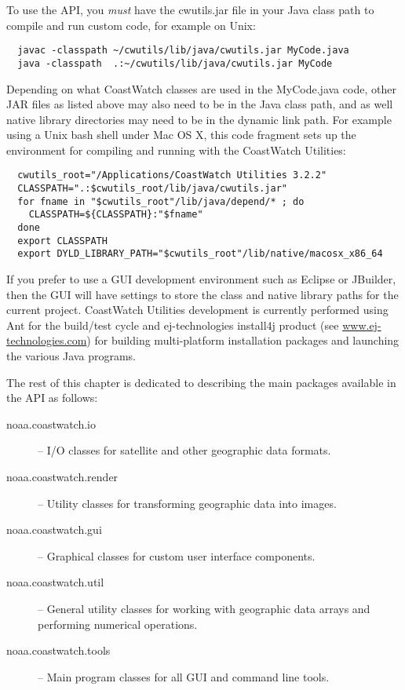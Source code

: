 To use the API, you {\em must} have the {\file cwutils.jar} file in
your Java class path to compile and run custom code, for example
on Unix:
\begin{verbatim}
  javac -classpath ~/cwutils/lib/java/cwutils.jar MyCode.java
  java -classpath  .:~/cwutils/lib/java/cwutils.jar MyCode
\end{verbatim}
Depending on what CoastWatch classes are used in the
{\file MyCode.java} code, other JAR files as listed above may also
need to be in the Java class path, and as well native library
directories may need to be in the dynamic link path.  For example
using a Unix bash shell under Mac OS X, this code fragment sets
up the environment for compiling and running with the CoastWatch
Utilities:
\begin{verbatim}
  cwutils_root="/Applications/CoastWatch Utilities 3.2.2"
  CLASSPATH=".:$cwutils_root/lib/java/cwutils.jar"
  for fname in "$cwutils_root"/lib/java/depend/* ; do
    CLASSPATH=${CLASSPATH}:"$fname"
  done
  export CLASSPATH
  export DYLD_LIBRARY_PATH="$cwutils_root"/lib/native/macosx_x86_64
\end{verbatim}
If you prefer to use a GUI development environment such as
Eclipse or JBuilder, then the GUI will have settings to store the
class and native library paths for the current project.
CoastWatch Utilities development is currently performed using Ant
for the build/test cycle and ej-technologies install4j product
(see \url{www.ej-technologies.com}) for building multi-platform
installation packages and launching the various Java programs.

The rest of this chapter is dedicated to describing the main
packages available in the API as follows:
\begin{description}

\item[{\java noaa.coastwatch.io}] -- I/O classes for satellite and
other geographic data formats.

\item[{\java noaa.coastwatch.render}] -- Utility classes for
transforming geographic data into images.

\item[{\java noaa.coastwatch.gui}] -- Graphical classes for custom
user interface components.

\item[{\java noaa.coastwatch.util}] -- General utility classes for
working with geographic data arrays and performing numerical
operations.

\item[{\java noaa.coastwatch.tools}] -- Main program classes for
all GUI and command line tools.

\end{description}


